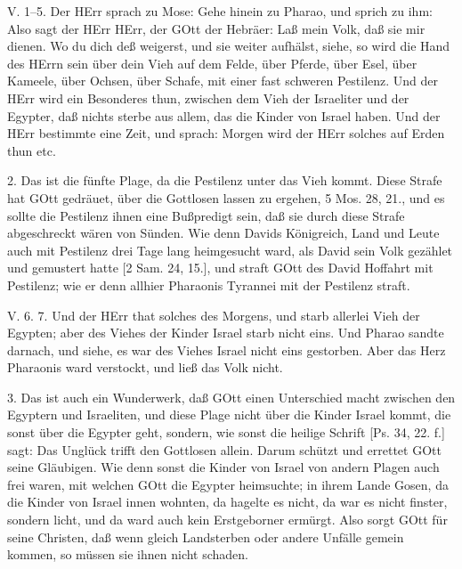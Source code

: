 \begin{schriftzitat}
V. 1–5. Der HErr sprach zu Mose: Gehe hinein zu Pharao, und sprich zu ihm: Also sagt der HErr HErr, der GOtt der Hebräer: Laß mein Volk, daß sie mir dienen. Wo du dich deß weigerst, und sie weiter aufhälst, siehe, so wird die Hand des HErrn sein über dein Vieh auf dem Felde, über Pferde, über Esel, über Kameele, über Ochsen, über Schafe, mit einer fast schweren Pestilenz. Und der HErr wird ein Besonderes thun, zwischen dem Vieh der Israeliter und der Egypter, daß nichts sterbe aus allem, das die Kinder von Israel haben. Und der HErr bestimmte eine Zeit, und sprach: Morgen wird der HErr solches auf Erden thun etc.
\end{schriftzitat}

2. Das ist die fünfte Plage, da die Pestilenz unter das Vieh kommt. Diese Strafe hat GOtt gedräuet, über die Gottlosen lassen zu ergehen, 5 Mos. 28, 21., und es sollte die Pestilenz ihnen eine Bußpredigt sein, daß sie durch diese Strafe abgeschreckt wären von Sünden. Wie denn Davids Königreich, Land und Leute auch mit Pestilenz drei Tage lang heimgesucht ward, als David sein Volk gezählet und gemustert hatte
[2 Sam. 24, 15.], und straft GOtt des David Hoffahrt mit Pestilenz; wie er denn allhier Pharaonis Tyrannei mit der Pestilenz straft.

\begin{schriftzitat}
V. 6. 7. Und der HErr that solches des Morgens, und starb allerlei Vieh der Egypten; aber des Viehes der Kinder Israel starb nicht eins. Und Pharao sandte darnach, und siehe, es war des Viehes Israel nicht eins gestorben. Aber das Herz Pharaonis ward verstockt, und ließ das Volk nicht.
\end{schriftzitat}

3. Das ist auch ein Wunderwerk, daß GOtt einen Unterschied macht zwischen den Egyptern und Israeliten, und diese Plage nicht über die Kinder Israel kommt, die sonst über die Egypter geht, sondern, wie sonst die heilige Schrift [Ps. 34, 22. f.] sagt: Das Unglück trifft den Gottlosen allein. Darum schützt und errettet GOtt seine Gläubigen. Wie denn sonst die Kinder von Israel von andern Plagen auch frei waren, mit welchen GOtt die Egypter heimsuchte; in ihrem Lande Gosen, da die Kinder von Israel innen wohnten, da hagelte es nicht, da war es nicht finster, sondern licht, und da ward auch kein Erstgeborner ermürgt. Also sorgt GOtt für seine Christen, daß wenn gleich Landsterben oder andere Unfälle gemein kommen, so müssen sie ihnen nicht schaden.

